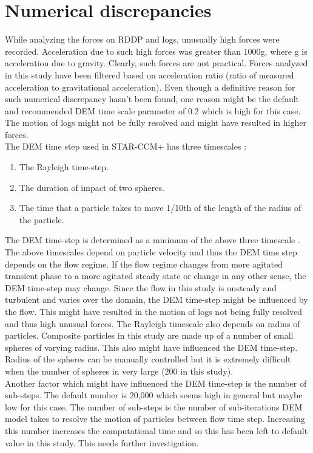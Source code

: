 \FloatBarrier
\section{Numerical discrepancies}
While analyzing the forces on RDDP and logs, unusually high forces were recorded. Acceleration due to such high forces was greater than 1000g, where g is acceleration due to gravity. Clearly, such forces are not practical. Forces analyzed in this study have been filtered based on acceleration ratio (ratio of measured acceleration to gravitational acceleration). Even though a definitive reason for such numerical discrepancy hasn't been found, one reason might be the default and recommended DEM time scale parameter of 0.2 which is high for this case. The motion of logs might not be fully resolved and might have resulted in higher forces.\\
The DEM time step used in STAR-CCM+ has three timescales \cite{DEMTimeStep}:
\begin{enumerate}
\item The Rayleigh time-step.
\item The duration of impact of two spheres.
\item The time that a particle takes to move 1/10th of the length of the radius of the particle. 
\end{enumerate}
The DEM time-step is determined as a minimum of the above three timescale \cite{DEMTimeStep}. The above timescales depend on particle velocity and thus the DEM time step depends on the flow regime. If the flow regime changes from more agitated  transient phase to a more agitated steady state or change in any other sense, the DEM time-step may change. Since the flow in this study is unsteady and turbulent and varies over the domain, the DEM time-step might be influenced by the flow. This might have resulted in the motion of logs not being fully resolved and thus high unusual forces. The Rayleigh timescale also depends on radius of particles. Composite particles in this study are made up of a number of small spheres of varying radius. This also might have influenced the DEM time-step. Radius of the spheres can be manually controlled but it is extremely difficult when the number of spheres in very large (200 in this study).\\
Another factor which might have influenced the DEM time-step is the number of sub-steps. The default number is 20,000 which seems high in general but maybe low for this case. The number of sub-steps is the number of sub-iterations DEM model takes to resolve the motion of particles between flow time step. Increasing this number increases the computational time and so this has been left to default value in this study. This needs further investigation.\\
